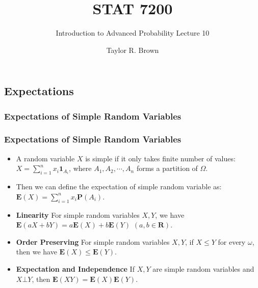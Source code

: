 \documentclass[handout]{beamer}
\title{STAT 7200}
\subtitle{Introduction to Advanced Probability \newline Lecture 10}
\author{Taylor R. Brown}
\institute{}
\date{}
\newcommand{\BP}{\mathbf{P}}
\newcommand{\BE}{\mathbf{E}}
\newcommand{\BI}{\mathbf{1}}
\begin{document}
\frame{\titlepage}

\section[Outline]{}


% 


\subsection{Expectations}


\subsubsection{Expectations of Simple Random Variables}

\frame
{
  \frametitle{Expectations of Simple Random Variables}

   \begin{itemize}


                         
\item<1-> A  random variable $X$ is simple if it only takes finite number of values: $X=\sum_{i=1}^n x_i \BI_{A_i}$, where $A_1, A_2,\cdots, A_n$ forms a partition of $\Omega$. 

\item<1-> Then we can define the expectation of simple random variable as:
                      $\BE(X)=\sum_{i=1}^n x_i \BP(A_i)$.

\item<1-> \textbf{Linearity} For simple random variables $X, Y$, we have $\BE(aX+bY)=a\BE(X)+b\BE(Y)$ $(a,b\in \mathbf{R})$.

\item<1-> \textbf{Order Preserving} For simple random variables $X, Y$, if $X\leq Y$ for every $\omega$, then we have $\BE(X)\leq \BE(Y)$.


\item<1-> \textbf{Expectation and Independence} If $X, Y$ are simple random variables and $X\bot Y$, then $\BE(XY)=\BE(X)\BE(Y)$.                         

                             
\end{itemize}
}
\end{document}
